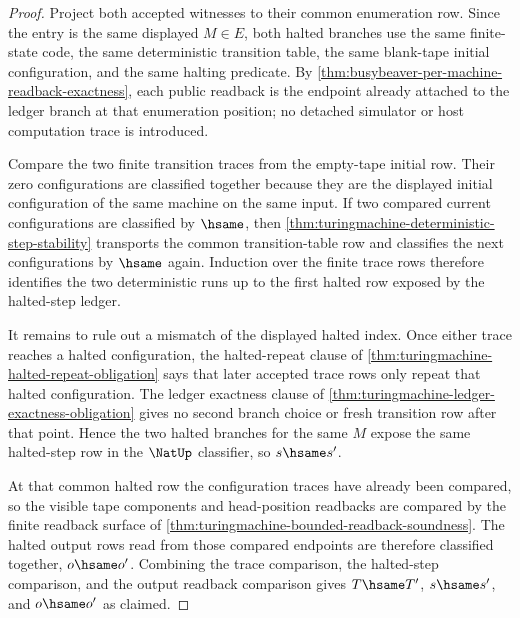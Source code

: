 \begin{proof}
Project both accepted witnesses to their common enumeration row. Since the
entry is the same displayed $M\in E$, both halted branches use the same
finite-state code, the same deterministic transition table, the same blank-tape
initial configuration, and the same halting predicate. By
\autoref{thm:busybeaver-per-machine-readback-exactness}, each public readback
is the endpoint already attached to the ledger branch at that enumeration
position; no detached simulator or host computation trace is introduced.

Compare the two finite transition traces from the empty-tape initial row. Their
zero configurations are classified together because they are the displayed
initial configuration of the same machine on the same input. If two compared
current configurations are classified by $\hsame$, then
\autoref{thm:turingmachine-deterministic-step-stability} transports the common
transition-table row and classifies the next configurations by $\hsame$ again.
Induction over the finite trace rows therefore identifies the two deterministic
runs up to the first halted row exposed by the halted-step ledger.

It remains to rule out a mismatch of the displayed halted index. Once either
trace reaches a halted configuration, the halted-repeat clause of
\autoref{thm:turingmachine-halted-repeat-obligation} says that later accepted
trace rows only repeat that halted configuration. The ledger exactness clause
of \autoref{thm:turingmachine-ledger-exactness-obligation} gives no second
branch choice or fresh transition row after that point. Hence the two halted
branches for the same $M$ expose the same halted-step row in the $\NatUp$
classifier, so $s\hsame s'$.

At that common halted row the configuration traces have already been compared,
so the visible tape components and head-position readbacks are compared by the
finite readback surface of
\autoref{thm:turingmachine-bounded-readback-soundness}. The halted output rows
read from those compared endpoints are therefore classified together,
$o\hsame o'$. Combining the trace comparison, the halted-step comparison, and
the output readback comparison gives $T\hsame T'$, $s\hsame s'$, and
$o\hsame o'$ as claimed.
\end{proof}

